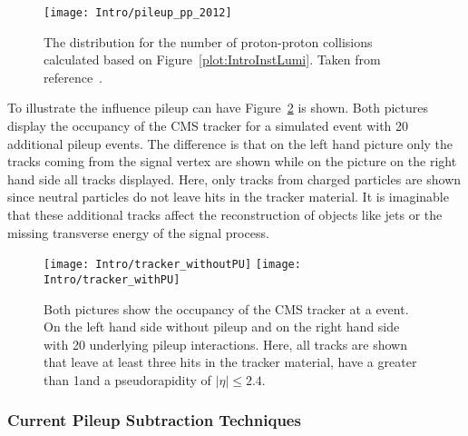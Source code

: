 \begin{figure}[!Hhtb]
    \centering
    \texttt{[image: Intro/pileup\_pp\_2012]}
    \caption[Number of proton proton collisions]{The distribution for the number of proton-proton collisions calculated based on Figure~\ref{plot:IntroInstLumi}. Taken from reference~. \label{plot:IntroPileupDistr}}
\end{figure}

To illustrate the influence pileup can have Figure~\ref{plot:IntroOccuTracker} is shown. Both pictures display the occupancy of the CMS tracker for a simulated \ttbar event with 20 additional pileup events. The difference is that on the left hand picture only the tracks coming from the signal vertex are shown while on the picture on the right hand side all tracks displayed. Here, only tracks from charged particles are shown since neutral particles do not leave hits in the tracker material. It is imaginable that these additional tracks affect the reconstruction of objects like jets or the missing transverse energy of the signal process.

\begin{figure}[!Hhtb]
    \centering
    \texttt{[image: Intro/tracker\_withoutPU]}
    \texttt{[image: Intro/tracker\_withPU]}
    \caption[Occupancy of the tracker with and without pileup]{Both pictures show the occupancy of the CMS tracker at a \ttbar event. On the left hand side without pileup and on the right hand side with 20 underlying pileup interactions. Here, all tracks are shown that leave at least three hits in the tracker material, have a \pt greater than 1\GeVc and a pseudorapidity of $\left|\eta\right|\leq2.4$. \label{plot:IntroOccuTracker}}
\end{figure}

\subsubsection{Current Pileup Subtraction Techniques \label{sec:IntroCurPST}}

